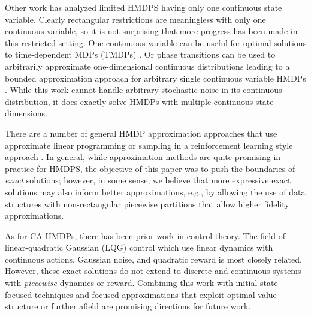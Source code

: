 \documentclass[twoside,11pt]{article}
\newcommand{\InventoryControl}{\textsc{Inventory Control }}
\begin{document}
Other work has analyzed limited HMDPS having only one continuous
state variable.  Clearly rectangular restrictions are meaningless with
only one continuous variable, so it is not surprising that more
progress has been made in this restricted setting.  One continuous
variable can be useful for optimal solutions to time-dependent MDPs 
(TMDPs) \cite{boyan01}.  Or phase transitions can be used to 
arbitrarily approximate one-dimensional continuous distributions
leading to a bounded approximation approach for arbitrary single continuous
variable HMDPs \cite{phase07}.  
While this work cannot handle arbitrary stochastic
noise in its continuous distribution, it does exactly solve HMDPs
with multiple continuous state dimensions.

There are a number of general HMDP approximation
approaches that use approximate linear programming \cite{kveton06}
or sampling in a reinforcement learning style approach \cite{munos02}.
In general, while approximation methods are quite promising in
practice for HMDPS, the objective of this paper was to push
the boundaries of \emph{exact} solutions; however, in some sense, 
we believe that more expressive exact solutions may also inform
better approximations, e.g., by allowing the use of data structures
with non-rectangular piecewise partitions that allow higher fidelity
approximations.

As for CA-HMDPs, there has been prior work in control theory. The field of linear-quadratic Gaussian (LQG) control \cite{lqgc} which use linear dynamics with continuous actions, Gaussian noise, and quadratic
reward is most closely related.  However, these exact solutions do
not extend to discrete and continuous systems with \emph{piecewise}
dynamics or reward.
%
Combining this work with initial state focused techniques \cite{hao09}
and focused approximations that exploit optimal value
structure \cite{apricodd} or further
afield \cite{munos02,kveton06,phase07} are promising directions for
future work.
\end{document}
